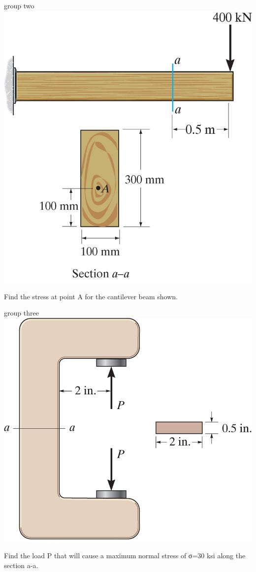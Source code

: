 \documentclass[
  letterpaper,
  ignorenonframetext,
  aspectratio=43,
  handout,
  12pt]{beamer}
\let\Oldincludegraphics\includegraphics
\renewcommand{\includegraphics}[2][]{\Oldincludegraphics[width=\textwidth,height=0.7\textheight,keepaspectratio]{#2}}
\begin{document}
\begin{frame}{group two}
\protect\hypertarget{group-two}{}
\includegraphics{../images/group-8-2.jpg}

Find the stress at point A for the cantilever beam shown.
\end{frame}

\begin{frame}{group three}
\protect\hypertarget{group-three}{}
\includegraphics{../images/group-8-3.jpg}

Find the load P that will cause a maximum normal stress of σ=30 ksi
along the section a-a.
\end{frame}
\end{document}
